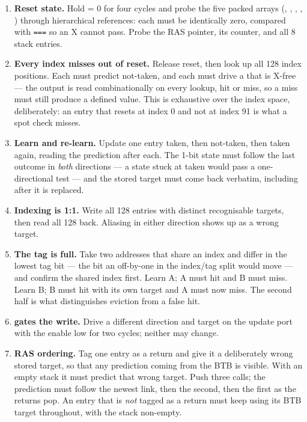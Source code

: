 \begin{enumerate}[leftmargin=*,itemsep=3pt]
\item[\textbf{1}] \textbf{Reset state.} Hold  = 0 for four
cycles and probe the five packed arrays (, , ,
, ) through hierarchical references: each must be
identically zero, compared with \verb|===| so an X cannot pass. Probe the RAS
pointer, its counter, and all 8 stack entries.

\item[\textbf{2}] \textbf{Every index misses out of reset.} Release reset, then
look up all 128 index positions. Each must predict not-taken, and each must
drive a  that is X-free --- the output is read
combinationally on every lookup, hit or miss, so a miss must still produce a
defined value. This is exhaustive over the index space, deliberately: an entry
that resets at index 0 and not at index 91 is what a spot check misses.

\item[\textbf{3}] \textbf{Learn and re-learn.} Update one entry taken, then
not-taken, then taken again, reading the prediction after each. The 1-bit state
must follow the last outcome in \emph{both} directions --- a state stuck at
taken would pass a one-directional test --- and the stored target must come back
verbatim, including after it is replaced.

\item[\textbf{4}] \textbf{Indexing is 1:1.} Write all 128 entries with distinct
recognisable targets, then read all 128 back. Aliasing in either direction shows
up as a wrong target.

\item[\textbf{5}] \textbf{The tag is full.} Take two addresses that share an
index and differ in the lowest tag bit --- the bit an off-by-one in the
index/tag split would move --- and confirm the shared index first. Learn A;
A must hit and B must miss. Learn B; B must hit with its own target and A must
now miss. The second half is what distinguishes eviction from a false hit.

\item[\textbf{6}] \textbf{ gates the write.} Drive a
different direction and target on the update port with the enable low for two
cycles; neither may change.

\item[\textbf{7}] \textbf{RAS ordering.} Tag one entry as a return and give it a
deliberately wrong stored target, so that any prediction coming from the BTB is
visible. With an empty stack it must predict that wrong target. Push three
calls; the prediction must follow the newest link, then the second, then the
first as the returns pop. An entry that is \emph{not} tagged as a return must
keep using its BTB target throughout, with the stack non-empty.


\end{enumerate}
